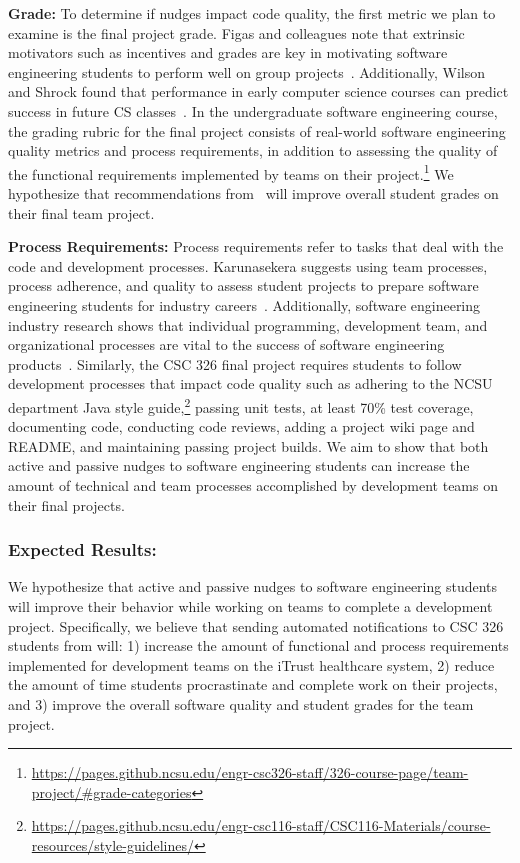 \textbf{Grade:} To determine if nudges impact code quality, the first metric we plan to examine is the final project grade. Figas and colleagues note that extrinsic motivators such as incentives and grades are key in motivating software engineering students to perform well on group projects~\cite{figas2013furtherance}. Additionally, Wilson and Shrock found that performance in early computer science courses can predict success in future CS classes~\cite{wilson2001contributing}. In the undergraduate software engineering course, the grading rubric for the final project consists of real-world software engineering quality metrics and process requirements, in addition to assessing the quality of the functional requirements implemented by teams on their project.\footnote{\url{https://pages.github.ncsu.edu/engr-csc326-staff/326-course-page/team-project/#grade-categories}} We hypothesize that recommendations from \TOOL~will improve overall student grades on their final team project.

\textbf{Process Requirements:} Process requirements refer to tasks that deal with the code and development processes. Karunasekera suggests using team processes, process adherence, and quality to assess student projects to prepare software engineering students for industry careers~\cite{karunasekera2007preparing}. Additionally, software engineering industry research shows that individual programming, development team, and organizational processes are vital to the success of software engineering products~\cite{crowston2004effective}. Similarly, the CSC 326 final project requires students to follow development processes that impact code quality such as adhering to the NCSU department Java style guide,\footnote{\url{https://pages.github.ncsu.edu/engr-csc116-staff/CSC116-Materials/course-resources/style-guidelines/}} passing unit tests, at least 70\% test coverage, documenting code, conducting code reviews, adding a project wiki page and README, and maintaining passing project builds. We aim to show that both active and passive nudges to software engineering students can increase the amount of technical and team processes accomplished by development teams on their final projects.

\subsubsection{Expected Results:}

We hypothesize that active and passive nudges to software engineering students will improve their behavior while working on teams to complete a development project. Specifically, we believe that sending automated notifications to CSC 326 students from \TOOL will: 1) increase the amount of functional and process requirements implemented for development teams on the iTrust healthcare system, 2) reduce the amount of time students procrastinate and complete work on their projects, and 3) improve the overall software quality and student grades for the team project.

\newpage